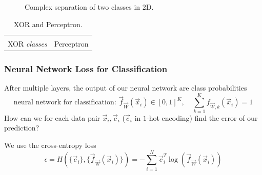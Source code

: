 \begin{figure}[!htb]
    \centering
    
    \caption{Complex separation of two classes in 2D.}
    \label{fig:nn_2d}
\end{figure}


\begin{table}[!htb]
    \centering
    \begin{tabular}{c|c}
         &  \\
        XOR \textit{classes} & Perceptron
    \end{tabular}
    \caption{XOR and Perceptron.}
    \label{tab:xor_perceptron}
\end{table}

\subsubsection{Neural Network Loss for Classification}

After multiple layers, the output of our neural network are class probabilities
\begin{equation}
    \text{neural network for classification: } \vec{f}_\vec{W}(\vec{x}_i) \in [0,1]^K, \quad \sum_{k=1}^K f_{\vec{W},k}(\vec{x}_i) = 1
\end{equation}
How can we for each data pair $\vec{x}_i, \vec{c}_i$ ($\vec{c}_i$ in $1$-hot encoding) find the error of our prediction?

We use the cross-entropy loss
\begin{equation}
    \epsilon = H(\{\vec{c}_i\}, \{\vec{f}_\vec{W}(\vec{x}_i)\}) = -\sum_{i=1}^N \vec{c}_i^T \log(\vec{f}_\vec{W}(\vec{x}_i))
\end{equation}


